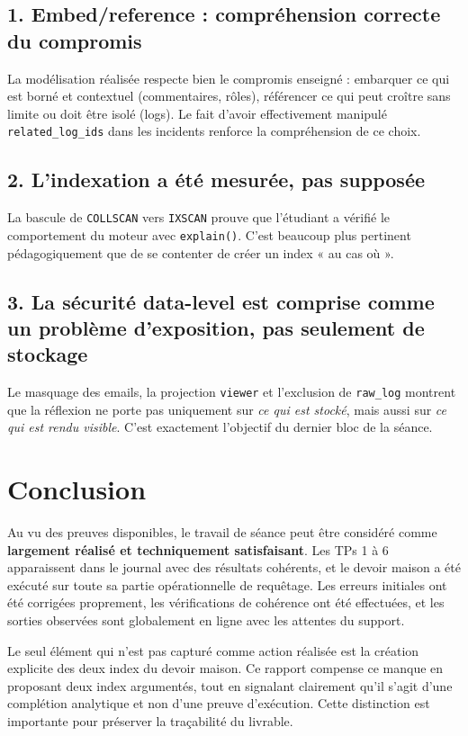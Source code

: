 \documentclass[11pt,a4paper]{article}
\begin{document}
\subsection{1. Embed/reference : compréhension correcte du compromis}

La modélisation réalisée respecte bien le compromis enseigné : embarquer ce qui est borné et contextuel (commentaires, rôles), référencer ce qui peut croître sans limite ou doit être isolé (logs). Le fait d'avoir effectivement manipulé \texttt{related\_log\_ids} dans les incidents renforce la compréhension de ce choix.

\subsection{2. L'indexation a été mesurée, pas supposée}

La bascule de \texttt{COLLSCAN} vers \texttt{IXSCAN} prouve que l'étudiant a vérifié le comportement du moteur avec \texttt{explain()}. C'est beaucoup plus pertinent pédagogiquement que de se contenter de créer un index « au cas où ».

\subsection{3. La sécurité data-level est comprise comme un problème d'exposition, pas seulement de stockage}

Le masquage des emails, la projection \texttt{viewer} et l'exclusion de \texttt{raw\_log} montrent que la réflexion ne porte pas uniquement sur \emph{ce qui est stocké}, mais aussi sur \emph{ce qui est rendu visible}. C'est exactement l'objectif du dernier bloc de la séance.

\section{Conclusion}

Au vu des preuves disponibles, le travail de séance peut être considéré comme \textbf{largement réalisé et techniquement satisfaisant}. Les TPs 1 à 6 apparaissent dans le journal avec des résultats cohérents, et le devoir maison a été exécuté sur toute sa partie opérationnelle de requêtage. Les erreurs initiales ont été corrigées proprement, les vérifications de cohérence ont été effectuées, et les sorties observées sont globalement en ligne avec les attentes du support.

Le seul élément qui n'est pas capturé comme action réalisée est la création explicite des deux index du devoir maison. Ce rapport compense ce manque en proposant deux index argumentés, tout en signalant clairement qu'il s'agit d'une complétion analytique et non d'une preuve d'exécution. Cette distinction est importante pour préserver la traçabilité du livrable.
\end{document}
